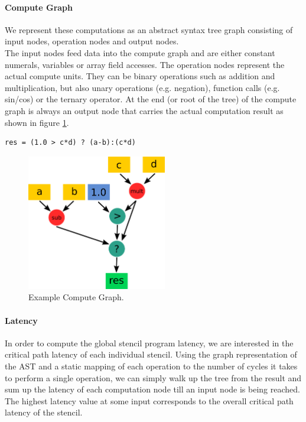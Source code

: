 \paragraph{Compute Graph}
We represent these computations as an abstract syntax tree graph consisting of input nodes, operation nodes and output nodes. \\
The input nodes feed data into the compute graph and are either constant numerals, variables or array field accesses. The operation nodes represent the actual compute units. They can be binary operations such as addition and multiplication, but also unary operations (e.g. negation), function calls (e.g. sin/cos) or the ternary operator. At the end (or root of the tree) of the compute graph is always an output node that carries the actual computation result as shown in figure \ref{fig:implementation-compute-graph}. 
\begin{verbatim}
res = (1.0 > c*d) ? (a-b):(c*d) 
\end{verbatim}
\begin{figure}[H]
	\centering
	\includegraphics[height=16em]{drawings/implementation-compute-graph.png}
	\caption{Example Compute Graph.}
	\label{fig:implementation-compute-graph}
\end{figure}


\paragraph{Latency}
In order to compute the global stencil program latency, we are interested in the critical path latency of each individual stencil. Using the graph representation of the AST and a static mapping of each operation to the number of cycles it takes to perform a single operation, we can simply walk up the tree from the result and sum up the latency of each computation node till an input node is being reached. The highest latency value at some input corresponds to the overall critical path latency of the stencil.


